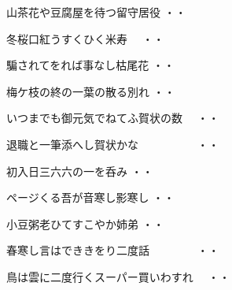 \vspace{0.6cm}
\begin{shiika}山茶花や豆腐屋を待つ留守居役
\hfill{・・}\end{shiika}
\vspace{0.6cm}
\begin{shiika}冬桜口紅うすくひく米寿　
\hfill{・・}\end{shiika}
\vspace{0.6cm}
\begin{shiika}騙されてをれば事なし枯尾花
\hfill{・・}\end{shiika}
\vspace{0.6cm}
\begin{shiika}梅ケ枝の終の一葉の散る別れ
\hfill{・・}\end{shiika}
\vspace{0.6cm}
\begin{shiika}いつまでも御元気でねてふ賀状の数　
\hfill{・・}\end{shiika}
\vspace{0.6cm}
\begin{shiika}退職と一筆添へし賀状かな　　　　　
\hfill{・・}\end{shiika}
\vspace{0.6cm}
\begin{shiika}初入日三六六の一を呑み
\hfill{・・}\end{shiika}
\vspace{0.6cm}
\begin{shiika}ページくる吾が音寒し影寒し
\hfill{・・}\end{shiika}
\vspace{0.6cm}
\begin{shiika}小豆粥老ひてすこやか姉弟
\hfill{・・}\end{shiika}
\vspace{0.6cm}
\begin{shiika}春寒し言はでききをり二度話　　　　
\hfill{・・}\end{shiika}
\vspace{0.6cm}
\begin{shiika}鳥は雲に二度行くスーパー買いわすれ　
\hfill{・・}\end{shiika}
